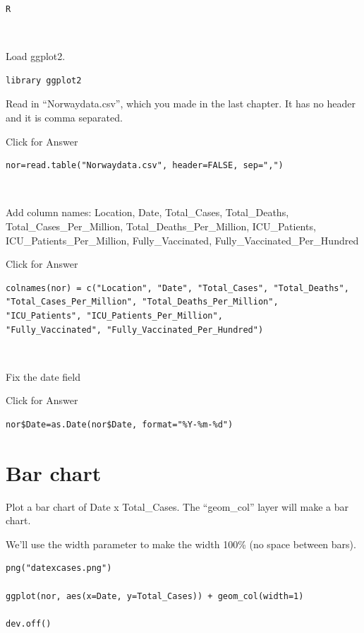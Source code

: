 \documentclass[
]{book}
\begin{document}
\begin{verbatim}
R
\end{verbatim}

~

Load ggplot2.

\begin{verbatim}
library ggplot2
\end{verbatim}

Read in ``Norwaydata.csv'', which you made in the last chapter. It has no header and it is comma separated.

Click for Answer

\begin{verbatim}
nor=read.table("Norwaydata.csv", header=FALSE, sep=",")
\end{verbatim}

~

Add column names: Location, Date, Total\_Cases, Total\_Deaths, Total\_Cases\_Per\_Million, Total\_Deaths\_Per\_Million,
ICU\_Patients, ICU\_Patients\_Per\_Million, Fully\_Vaccinated, Fully\_Vaccinated\_Per\_Hundred

Click for Answer

\begin{verbatim}
colnames(nor) = c("Location", "Date", "Total_Cases", "Total_Deaths",
"Total_Cases_Per_Million", "Total_Deaths_Per_Million",
"ICU_Patients", "ICU_Patients_Per_Million",
"Fully_Vaccinated", "Fully_Vaccinated_Per_Hundred")
\end{verbatim}

~

Fix the date field

Click for Answer

\begin{verbatim}
nor$Date=as.Date(nor$Date, format="%Y-%m-%d")
\end{verbatim}

\hypertarget{bar-chart}{%
\section{Bar chart}\label{bar-chart}}

Plot a bar chart of Date x Total\_Cases. The ``geom\_col'' layer will make a bar chart.

We'll use the width parameter to make the width 100\% (no space between bars).

\begin{verbatim}
png("datexcases.png")

ggplot(nor, aes(x=Date, y=Total_Cases)) + geom_col(width=1)

dev.off()
\end{verbatim}
\end{document}

